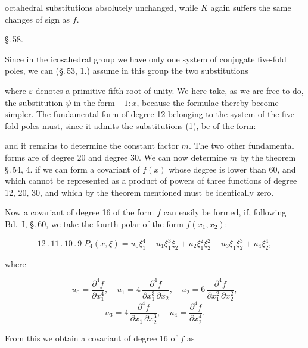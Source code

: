 octahedral substitutions absolutely unchanged, while $K$ again
suffers the same changes of sign as $f$.

\begin{center}
\S.\,58.

\end{center}

Since in the icosahedral group we have only one system of conjugate
five-fold poles, we can (\S.\,53, 1.) assume in this group
the two substitutions


where $\varepsilon$ denotes a primitive fifth root of unity.
We here take, as we are free to do, the substitution $\psi$ in the
form $-1:x$, because the formulae thereby become simpler.
The fundamental form of degree 12 belonging to the system of the
five-fold poles must, since it admits the substitutions (1), be of
the form:


and it remains to determine the constant
factor $m$. The two other fundamental forms are of degree 20
and degree 30. We can now determine $m$ by the theorem \S.\,54, 4.
if we can form a covariant of $f(x)$
whose degree is lower than 60, and which cannot be represented
as a product of powers of three functions of degree 12, 20, 30,
and which by the theorem mentioned must be identically
zero.

Now a covariant of degree 16 of the
form $f$ can easily be formed, if, following Bd.\ I, \S.\,60, we take the fourth polar of the
form $f(x_1,x_2)$:

\[
12\,.\,11\,.\,10\,.\,9\;P_4(x,\xi) = u_0\xi_1^4 + u_1\xi_1^3\xi_2 + u_2\xi_1^2\xi_2^2 + u_3\xi_1\xi_2^3 + u_4\xi_2^4,
\]

where

\[
u_0 = \frac{\partial^4 f}{\partial x_1^4}, \quad u_1 = 4\,\frac{\partial^4 f}{\partial x_1^3\,\partial x_2}, \quad u_2 = 6\,\frac{\partial^4 f}{\partial x_1^2\,\partial x_2^2},
\]
\[
u_3 = 4\,\frac{\partial^4 f}{\partial x_1\,\partial x_2^3}, \quad u_4 = \frac{\partial^4 f}{\partial x_2^4}.
\]

From this we obtain a covariant of degree 16 of $f$ as
